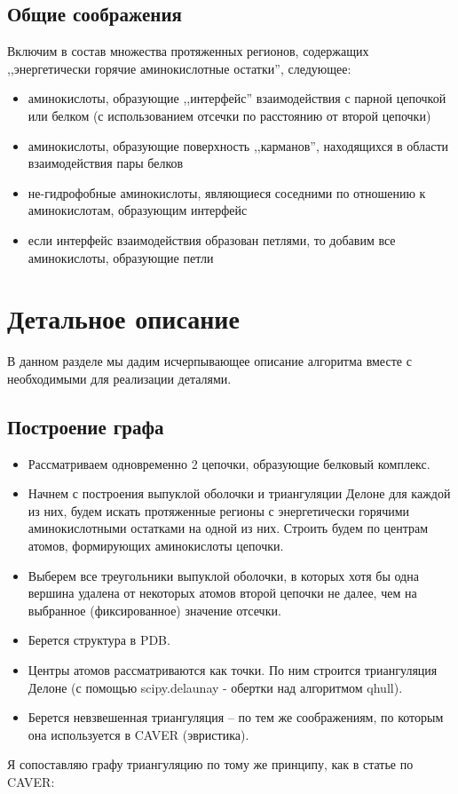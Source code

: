 \subsection{Общие соображения}
Включим в состав множества протяженных регионов, содержащих ,,энергетически горячие аминокислотные остатки'', следующее:
\begin{itemize}
\item аминокислоты, образующие ,,интерфейс'' взаимодействия с парной цепочкой или белком (с использованием отсечки по расстоянию от второй цепочки)
\item аминокислоты, образующие поверхность ,,карманов'', находящихся в области взаимодействия пары белков
\item не-гидрофобные аминокислоты, являющиеся соседними по отношению к аминокислотам, образующим интерфейс
\item если интерфейс взаимодействия образован петлями, то добавим все аминокислоты, образующие петли 
\end{itemize}

\section{Детальное описание}
В данном разделе мы дадим исчерпывающее описание алгоритма вместе с необходимыми для реализации деталями.
\subsection{Построение графа}
\begin{itemize}
\item Рассматриваем одновременно 2 цепочки, образующие белковый комплекс.
\item Начнем с построения выпуклой оболочки и триангуляции Делоне для каждой из них, будем искать протяженные регионы с энергетически горячими аминокислотными остатками  на одной из них. Строить будем по центрам атомов, формирующих аминокислоты цепочки.
\item Выберем все треугольники выпуклой оболочки, в которых хотя бы одна вершина удалена от некоторых атомов второй цепочки не далее, чем на выбранное (фиксированное) значение отсечки.
\end{itemize}


\begin{itemize}
\item Берется структура в PDB.
\item Центры атомов рассматриваются как точки. По ним строится триангуляция Делоне (с помощью scipy.delaunay - обертки над алгоритмом qhull).
\item Берется невзвешенная триангуляция -- по тем же соображениям, по которым она используется в CAVER (эвристика).
\end{itemize}
Я сопоставляю графу триангуляцию по тому же принципу, как в статье по CAVER:

